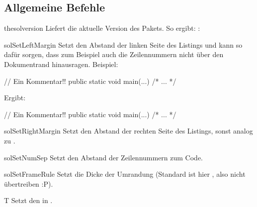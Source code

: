 \documentclass{sopra-base}
\begin{document}
\subsection{Allgemeine Befehle}

\begin{command}{thesolversion}{}
    Liefert die aktuelle Version des Pakets. So ergibt: : \thesolversion\\
\end{command}

\begin{command}{solSetLeftMargin}{}
    Setzt den Abstand der linken Seite des Listings und kann so dafür sorgen, dass zum
    Beispiel auch die Zeilennummern nicht über den Dokumentrand hinausragen. Beispiel:
\begin{latex}[morekeywords={[5]{\\solSetLeftMargin}}]
\solSetLeftMargin{15pt}
\begin{java}
// Ein Kommentar!!
public static void main(...){ /* ... */ }
\end{java}
\end{latex}
Ergibt: {
\solSetLeftMargin{15pt}
\begin{java}
// Ein Kommentar!!
public static void main(...){ /* ... */ }
\end{java}
}
\end{command}

\begin{command}{solSetRightMargin}{}
    Setzt den Abstand der rechten Seite des Listings, sonst analog zu .
\end{command}

\begin{command}{solSetNumSep}{}
    Setzt den Abstand der Zeilennummern zum Code.
\end{command}

\begin{command}{solSetFrameRule}{}
    Setzt die Dicke der Umrandung (Standard ist hier \bvoid{0.75pt}, also nicht übertreiben :P).
\end{command}

\begin{command}{T}{}
    Setzt den  in .
\end{command}
\end{document}
